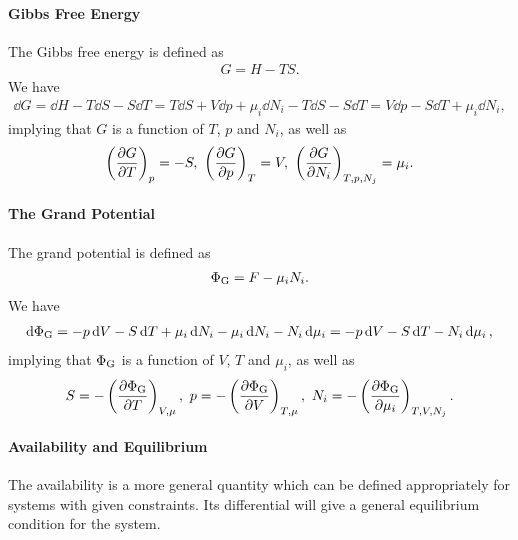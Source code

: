 \paragraph{Gibbs Free Energy}
The Gibbs free energy is defined as
\begin{align*}
	G = H - TS.
\end{align*}
We have
\begin{align*}
	\dd{G} = \dd{H} - T\dd{S} - S\dd{T} = T\dd{S} + V\dd{p} + \mu_{i}\dd{N_{i}} - T\dd{S} - S\dd{T} = V\dd{p} - S\dd{T} + \mu_{i}\dd{N_{i}},
\end{align*}
implying that $G$ is a function of $T$, $p$ and $N_{i}$, as well as
\begin{align*}
	\fix{\pdv{G}{T}}{p} = -S,\ \fix{\pdv{G}{p}}{T} = V,\ \fix{\pdv{G}{N_{i}}}{T, p,  N_{j}} = \mu_{i}.
\end{align*}

\paragraph{The Grand Potential}
The grand potential is defined as
\begin{align*}
	\Phi_{\text{G}} = F - \mu_{i}N_{i}.
\end{align*}
We have
\begin{align*}
	\dd{\Phi_{\text{G}}} = -p\dd{V} - S\dd{T} + \mu_{i}\dd{N_{i}} - \mu_{i}\dd{N_{i}} - N_{i}\dd{\mu_{i}} = -p\dd{V} - S\dd{T} - N_{i}\dd{\mu_{i}},
\end{align*}
implying that $\Phi_{\text{G}}$ is a function of $V$, $T$ and $\mu_{i}$, as well as
\begin{align*}
	S = - \left(\pdv{\Phi_{\text{G}}}{T}\right)_{V, \mu},\ p = - \left(\pdv{\Phi_{\text{G}}}{V}\right)_{T, \mu},\ N_{i} = - \left(\pdv{\Phi_{\text{G}}}{\mu_{i}}\right)_{T, V, N_{j}}.
\end{align*}

\paragraph{Availability and Equilibrium}
The availability is a more general quantity which can be defined appropriately for systems with given constraints. Its differential will give a general equilibrium condition for the system.

